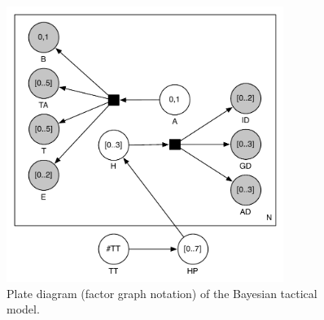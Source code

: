\begin{figure}[h]
\begin{center}
\includegraphics[width=9cm]{images/SpecialTacticsSimple_plate.pdf}
\caption{Plate diagram (factor graph notation) of the Bayesian tactical model.}
\label{fig:SpecialTacticsSimple_plate}
\end{center}
\end{figure}

